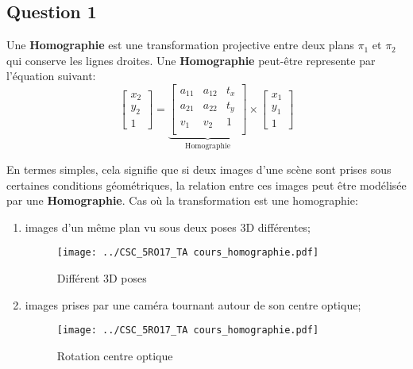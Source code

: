 \documentclass[../CSC_5RO17_TA_TP1.tex]{subfiles}
\begin{document}
\subsection*{Question 1}
\begin{definition}
    Une \textbf{Homographie} est une transformation projective entre deux plans $\pi_1$ et $\pi_2$ qui conserve les lignes droites. Une \textbf{Homographie} peut-être represente par l'équation suivant:
    \begin{equation}
        \boxed{
            \begin{bmatrix}
            x_2\\ y_2\\ 1
            \end{bmatrix}
            =
            \underbrace{
                \begin{bmatrix}
                    a_{11} & a_{12} & t_x\\
                    a_{21} & a_{22} & t_y\\
                    v_1    & v_2    & 1\\
                \end{bmatrix}
            }_{\text{Homographie}}
            \times
            \begin{bmatrix}
                x_1\\ y_1\\ 1
            \end{bmatrix}
        }
    \end{equation}
\end{definition}
\noindent En termes simples, cela signifie que si deux images d'une scène sont prises sous certaines conditions géométriques, la relation entre ces images peut être modélisée par une \textbf{Homographie}. Cas où la transformation est une homographie:
\begin{enumerate}[noitemsep, rightmargin=\leftmargin]
    \item images d'un même plan vu sous deux poses 3D différentes;
    \begin{figure}[H]
        \centering
        \texttt{[image: ../CSC\_5RO17\_TA cours\_homographie.pdf]}
        \caption{Différent 3D poses}
        \label{fig_2_3d_positions}
    \end{figure}
    \item images prises par une caméra tournant autour de son centre optique;
    \begin{figure}[H]
        \centering
        \texttt{[image: ../CSC\_5RO17\_TA cours\_homographie.pdf]}
        \caption{Rotation centre optique}
        \label{fig_rotation_optical_center}
    \end{figure}
\end{enumerate}
\end{document}
